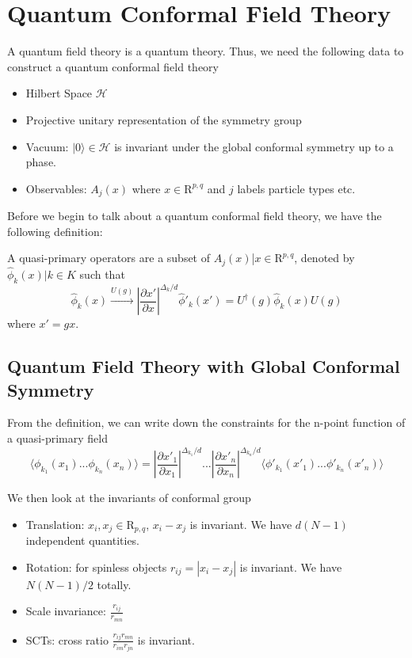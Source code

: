 \documentclass[a4paper,11pt]{article}
\begin{document}
\newpage
\section{Quantum Conformal Field Theory}
A quantum field theory is a quantum theory. Thus, we need the following data to construct a quantum conformal field theory
\begin{itemize}
    \item Hilbert Space $\mathcal{H}$
    \item Projective unitary representation of the symmetry group
    \item Vacuum: $|0\rangle\in\mathcal{H}$ is invariant under the global conformal symmetry up to a phase.
    \item Observables: $A_{j}(x)$ where $x\in\mathrm{R}^{p,q}$ and $j$ labels particle types etc.
\end{itemize}

Before we begin to talk about a quantum conformal field theory, we have the following definition:
\begin{framed}
A quasi-primary operators are a subset of {$A_j(x)$|$x\in\mathrm{R}^{p,q}$}, denoted by ${\hat{\phi}_k(x)|k\in K}$ such that 
\begin{equation*}
    \hat{\phi}_k(x)\xrightarrow{U(g)}\left|\frac{\partial x'}{\partial x}\right|^{\Delta_k/d}\hat{\phi}'_k(x')=U^\dagger(g)\hat{\phi}_k(x)U(g)
\end{equation*}
where $x'=gx$.
\end{framed}
\subsection{Quantum Field Theory with Global Conformal Symmetry}
From the definition, we can write down the constraints for the n-point function of a quasi-primary field
\begin{equation}
    \langle\phi_{k_1}(x_1)...\phi_{k_n}(x_n)\rangle=\left|\frac{\partial x'_1}{\partial x_1}\right|^{\Delta_{k_1}/d}...\left|\frac{\partial x'_n}{\partial x_n}\right|^{\Delta_{k_n}/d} \langle\phi'_{k_1}(x'_1)...\phi'_{k_n}(x'_n)\rangle
\label{constraints on n-point function}
\end{equation}

We then look at the invariants of conformal group
\begin{itemize}
    \item Translation: $x_i,x_j\in\mathrm{R}_{p,q}$, $x_i-x_j$ is invariant. We have $d(N-1)$ independent quantities.
    \item Rotation: for spinless objects $r_{ij}=\left|x_i-x_j\right|$ is invariant. We have $N(N-1)/2$ totally.
    \item Scale invariance: $\frac{r_{ij}}{r_{mn}}$
    \item SCTs: cross ratio $\frac{r_{ij}r_{mn}}{r_{im}r_{jn}}$ is invariant.
\end{itemize}
\vspace{3in}
\end{document}

